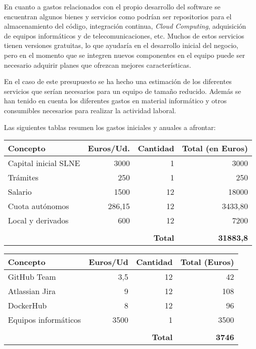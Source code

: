 En cuanto a gastos relacionados con el propio desarrollo del software se encuentran algunos bienes y servicios como podrían ser repositorios para el almacenamiento del código, integración continua, \textit{Cloud Computing}, adquisición de equipos informáticos y de telecomunicaciones, etc. Muchos de estos servicios tienen versiones gratuitas, lo que ayudaría en el desarrollo inicial del negocio, pero en el momento que se integren nuevos componentes en el equipo puede ser necesario adquirir planes que ofrezcan mejores características.

En el caso de este presupuesto se ha hecho una estimación de los diferentes servicios que serían necesarios para un equipo de tamaño reducido. Además se han tenido en cuenta los diferentes gastos en material informático y otros consumibles necesarios para realizar la actividad laboral.


\pagebreak
Las siguientes tablas resumen los gastos iniciales y anuales a afrontar:
\bigskip


\begin{table}[!h]
	\centering
	\begin{adjustbox}{width=1\textwidth}
	\begin{tabular}{|l|r|r|r|}
		\hline
		\textbf{Concepto} & \textbf{Euros/Ud.} & \textbf{Cantidad} & \textbf{Total (en Euros)} \\ \hline
		Capital inicial SLNE & 3000 & 1 & 3000 \\ \hline
		Trámites & 250 & 1 & 250 \\ \hline
		Salario & 1500 & 12 & 18000 \\ \hline
		Cuota autónomos & 286,15 & 12 & 3433,80 \\ \hline
		Local y derivados & 600 & 12 & 7200 \\ \hline
		&  &  &  \\
		&  & \textbf{Total} & \textbf{31883,8} \\ \hline
	\end{tabular}
	\end{adjustbox}
\end{table}


\begin{table}[!h]
	\centering
	\begin{adjustbox}{width=1\textwidth}
		\begin{tabular}{|l|r|r|r|}
			\hline
			\textbf{Concepto} & \textbf{Euros/Ud} & \textbf{Cantidad} & \textbf{Total (Euros)} \\ \hline
			GitHub Team & 3,5 & 12 & 42 \\ \hline
			Atlassian Jira & 9 & 12 & 108 \\ \hline
			DockerHub & 8 & 12 & 96 \\ \hline
			Equipos informáticos & 3500 & 1 & 3500 \\ \hline
			&  &  &  \\
			&  & \textbf{Total} & \textbf{3746} \\ \hline
		\end{tabular}
	\end{adjustbox}
\end{table}

